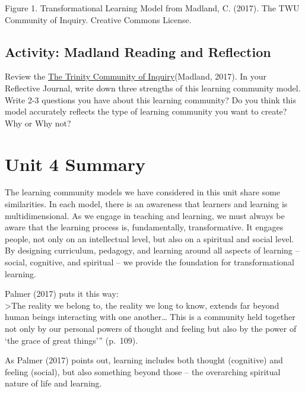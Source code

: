 \documentclass[
]{book}
\begin{document}
Figure 1. Transformational Learning Model from Madland, C. (2017). The TWU Community of Inquiry. Creative Commons
License.

\hypertarget{activity-madland-reading-and-reflection}{%
\subsection{Activity: Madland Reading and Reflection}\label{activity-madland-reading-and-reflection}}

\begin{reflect}
Review the \href{assets/unit4/Madland-transformational-learning.pdf}{The
Trinity Community of Inquiry}(Madland, 2017). In your Reflective
Journal, write down three strengths of this learning community model.
Write 2-3 questions you have about this learning community? Do you think
this model accurately reflects the type of learning community you want
to create? Why or Why not?
\end{reflect}

\hypertarget{unit-4-summary}{%
\section*{Unit 4 Summary}\label{unit-4-summary}}

The learning community models we have considered in this unit share some similarities. In each model, there is an awareness that learners and learning is multidimensional. As we engage in teaching and learning, we must always be aware that the learning process is, fundamentally, transformative. It engages people, not only on an intellectual level, but also on a spiritual and social level. By designing curriculum, pedagogy, and learning around all aspects of learning -- social, cognitive, and spiritual -- we provide the foundation for transformational learning.

Palmer (2017) puts it this way:\\
\textgreater The reality we belong to, the reality we long to know, extends far beyond human beings interacting with one another\ldots{} This is a community held together not only by our personal powers of thought and feeling but also by the power of `the grace of great things''' (p.~109).

As Palmer (2017) points out, learning includes both thought (cognitive) and feeling (social), but also something beyond those -- the overarching spiritual nature of life and learning.
\end{document}
